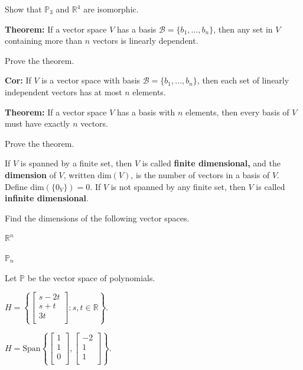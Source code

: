 \documentclass[12pt,letterpaper]{article}
\begin{document}
\begin{enumerate}

\Problem Show that $\mathbb{P}_3$ and $\mathbb{R}^4$ are isomorphic.

\vfill

{\bf Theorem:} If a vector space $V$ has a basis $\mathcal{B}=\{b_1, \dots, b_n\}$, then any set in $V$ containing more than $n$ vectors is linearly dependent.

\Problem Prove the theorem.

\vfill

{\bf Cor:} If $V$ is a vector space with basis $\mathcal{B}=\{b_1, \dots, b_n\}$, then each set of linearly independent vectors has at most $n$ elements.

{\bf Theorem:} If a vector space $V$ has a basis with $n$ elements, then every basis of $V$ must have exactly $n$ vectors.

\Problem Prove the theorem.

\vfill

\newpage

\begin{defn}
If $V$ is spanned by a finite set, then $V$ is called {\bf finite dimensional,} and the {\bf dimension} of $V$, written $\text{dim}(V)$, is the number of vectors in a basis of $V$. Define $\text{dim}(\{0_V\})=0$. If $V$ is not spanned by any finite set, then $V$ is called {\bf infinite dimensional}.
\end{defn}




\Problem Find the dimensions of the following vector spaces.

\Part $\mathbb{R}^n$

\vfill

\Part $\mathbb{P}_n$

\vfill

\Part Let $\mathbb{P}$ be the vector space of polynomials.

\vfill

\Part $H=\left\{\begin{bmatrix} s-2t\\ s+t\\ 3t\\ \end{bmatrix} : s,t \in \mathbb{R} \right\}$.

\vfill

\Part $H=\text{Span}\left\{ \begin{bmatrix} 1\\ 1\\ 0\\ \end{bmatrix}, \begin{bmatrix} -2\\ 1\\ 1\\ \end{bmatrix}\right\}$.


\end{enumerate}
\end{document}

